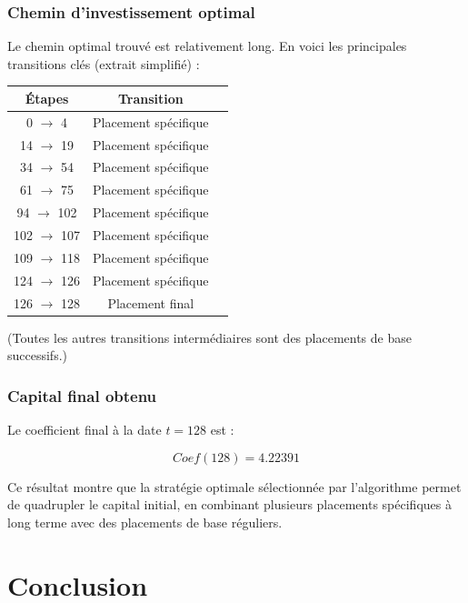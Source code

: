\documentclass[a4paper,11pt]{article}
\begin{document}
\subsubsection{Chemin d’investissement optimal}

Le chemin optimal trouvé est relativement long. En voici les principales transitions clés (extrait simplifié) :

\begin{center}
	\begin{tabular}{|c|c|c|}
		\hline
		Étapes               & Transition            \\
		\hline
		0 $\rightarrow$ 4     & Placement spécifique \\ 
		14 $\rightarrow$ 19   & Placement spécifique \\
		34 $\rightarrow$ 54   & Placement spécifique \\
		61 $\rightarrow$ 75   & Placement spécifique \\
		94 $\rightarrow$ 102  & Placement spécifique \\
		102 $\rightarrow$ 107 & Placement spécifique \\
		109 $\rightarrow$ 118 & Placement spécifique \\
		124 $\rightarrow$ 126 & Placement spécifique \\
		126 $\rightarrow$ 128 & Placement final       \\
		\hline
	\end{tabular}
\end{center}

(Toutes les autres transitions intermédiaires sont des placements de base successifs.)

\vspace{0.3cm}

\subsubsection{Capital final obtenu}

Le coefficient final à la date $t = 128$ est :

\[
	\boxed{Coef(128) = 4.22391}
\]

Ce résultat montre que la stratégie optimale sélectionnée par l’algorithme permet de quadrupler le capital initial, en combinant plusieurs placements spécifiques à long terme avec des placements de base réguliers.



\section{Conclusion}
\end{document}
